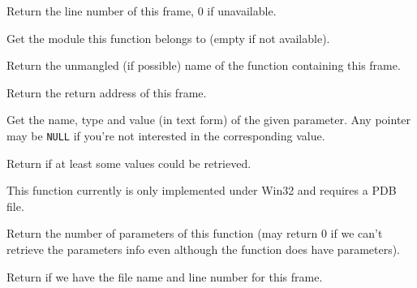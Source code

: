 \label{wxstackframegetline}


Return the line number of this frame, $0$ if unavailable.




\label{wxstackframegetmodule}


Get the module this function belongs to (empty if not available).


\label{wxstackframegetname}


Return the unmangled (if possible) name of the function containing this
frame.


\label{wxstackframegetoffset}


Return the return address of this frame.


\label{wxstackframegetparam}


Get the name, type and value (in text form) of the given parameter.
Any pointer may be \texttt{NULL} if you're not interested in the corresponding
value.

Return \true if at least some values could be retrieved.

This function currently is only implemented under Win32 and requires a PDB
file.


\label{wxstackframegetparamcount}


Return the number of parameters of this function (may return $0$ if we
can't retrieve the parameters info even although the function does have
parameters).


\label{wxstackframehassourcelocation}


Return \true if we have the file name and line number for this frame.


